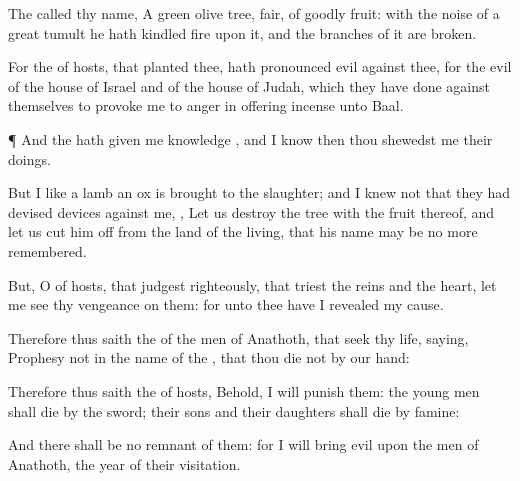 {The
{}
called thy
name, A
green olive
tree,
fair,
{} of
goodly
fruit: with the
noise of a
great
tumult he hath
kindled
fire upon it, and the
branches of it are
broken.

For the
{} of
hosts, that
planted thee, hath
pronounced
evil against thee,
for the
evil of the
house of
Israel and of the
house of
Judah, which they have
done against themselves to provoke me to
anger in offering
incense unto
Baal.


\par }{\PP {}¶ And the
{} hath given me
knowledge
{}, and I
know
{} then thou
shewedst me their
doings.

But I
{} like a
lamb
{} an
ox
{} is
brought to the
slaughter; and I
knew not that they had
devised
devices against me,
{}, Let us
destroy the
tree with the
fruit thereof, and let us cut him
off from the
land of the
living, that his
name may be no more
remembered.

But, O
{} of
hosts, that
judgest
righteously, that
triest the
reins and the
heart, let me
see thy
vengeance on them: for unto thee have I
revealed my
cause.

Therefore thus
saith the
{} of the
men of
Anathoth, that
seek thy
life,
saying,
Prophesy not in the
name of the
{}, that thou
die not by our
hand:

Therefore thus
saith the
{} of
hosts, Behold, I will
punish them: the young
men shall
die by the
sword; their
sons and their
daughters shall
die by
famine:

And there shall be no
remnant of them: for I will
bring
evil upon the
men of
Anathoth,
{} the
year of their
visitation.




\par }
